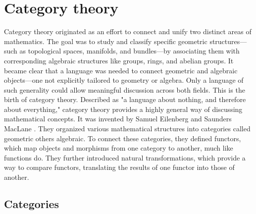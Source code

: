 \section{Category theory} \label{sec:catgories}



Category theory originated as an effort to connect and unify two distinct areas of mathematics.  The goal was to study and classify specific geometric structures—such as topological spaces, manifolds, and bundles—by associating them with corresponding algebraic structures like groups, rings, and abelian groups. It became clear that a language was needed to connect geometric and algebraic objects—one not explicitly tailored to geometry or algebra. Only a language of such generality could allow meaningful discussion across both fields.  This is the birth of category theory.
Described as "a language about nothing, and therefore about everything," category theory provides a highly general way of discussing mathematical concepts.  It was invented by Samuel Eilenberg and Saunders MacLane \cite{eilenbergGeneralTheoryNatural1945}. They organized various mathematical structures into categories called geometric others algebraic. To connect these categories, they defined functors, which map objects and morphisms from one category to another, much like functions do. They further introduced natural transformations, which provide a way to compare functors, translating the results of one functor into those of another. \cite{yanofskyMonoidalCategoryTheory2024}


\subsection{Categories}

